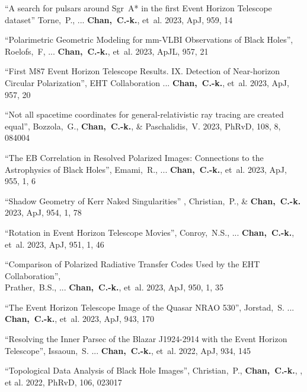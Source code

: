 \begin{ilist}
\item ``A search for pulsars around Sgr~A* in the first Event Horizon Telescope dataset''
  Torne,~P., ... \textbf{Chan,~C.-k.}, et~al.
  2023, ApJ, 959, 14

\item ``Polarimetric Geometric Modeling for mm-VLBI Observations of Black Holes'',
  Roelofs,~F, ... \textbf{Chan,~C.-k.}, et~al.
  2023, ApJL, 957, 21

\item ``First M87 Event Horizon Telescope Results. IX. Detection of Near-horizon Circular Polarization'',
  EHT Collaboration ... \textbf{Chan,~C.-k.}, et~al.
  2023, ApJ, 957, 20

\item ``Not all spacetime coordinates for general-relativistic ray tracing are created equal'',
  Bozzola,~G., \textbf{Chan,~C.-k.}, \& Paschalidis,~V.
  2023, PhRvD, 108, 8, 084004

\item ``The EB Correlation in Resolved Polarized Images: Connections to the Astrophysics of Black Holes'',
  Emami,~R., ... \textbf{Chan,~C.-k.}, et~al.
  2023, ApJ, 955, 1, 6

\item ``Shadow Geometry of Kerr Naked Singularities''
  , Christian,~P., \& \textbf{Chan,~C.-k.}
  2023, ApJ, 954, 1, 78

\item ``Rotation in Event Horizon Telescope Movies'',
  Conroy,~N.S., ... \textbf{Chan,~C.-k.}, et~al.
  2023, ApJ, 951, 1, 46

\item ``Comparison of Polarized Radiative Transfer Codes Used by the EHT Collaboration'',\\
  Prather,~B.S., ... \textbf{Chan,~C.-k.}, et~al.
  2023, ApJ, 950, 1, 35

\item ``The Event Horizon Telescope Image of the Quasar NRAO 530'',
  Jorstad,~S. ... \textbf{Chan,~C.-k.}, et~al.
  2023, ApJ, 943, 170

\item ``Resolving the Inner Parsec of the Blazar J1924-2914 with the Event Horizon Telescope'',
  Issaoun,~S. ... \textbf{Chan,~C.-k.}, et~al.
  2022, ApJ, 934, 145

\item ``Topological Data Analysis of Black Hole Images'',
  Christian,~P., \textbf{Chan,~C.-k.}, , et al.
  2022, PhRvD, 106, 023017


\end{ilist}
